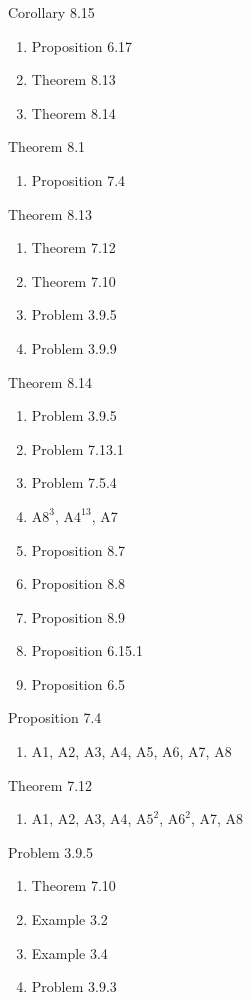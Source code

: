 \documentclass[11pt]{hmcpset}
\newenvironment{problem1}[1]{\noindent {\bf Problem #1}}
{\medskip}
\begin{document}
\begin{problem1}{3. (a)}
\noindent Corollary 8.15
\begin{enumerate}
\item{Proposition 6.17}
\item{Theorem 8.13}
\item{Theorem 8.14}\\
\end{enumerate}

\noindent Theorem 8.1
\begin{enumerate}
\item{Proposition 7.4}\\
\end{enumerate}

\noindent Theorem 8.13
\begin{enumerate}
\item{Theorem 7.12}
\item{Theorem 7.10}
\item{Problem 3.9.5}
\item{Problem 3.9.9}\\
\end{enumerate}

\noindent Theorem 8.14
\begin{enumerate}
\item{Problem 3.9.5}
\item{Problem 7.13.1}
\item{Problem 7.5.4}
\item{A$8^3$, A$4^{13}$, A7}
\item{Proposition 8.7}
\item{Proposition 8.8}
\item{Proposition 8.9}
\item{Proposition 6.15.1}
\item{Proposition 6.5}\\
\end{enumerate}

\noindent Proposition 7.4
\begin{enumerate}
\item{A1, A2, A3, A4, A5, A6, A7, A8}\\
\end{enumerate}

\noindent Theorem 7.12
\begin{enumerate}
\item{A1, A2, A3, A4, A$5^2$, A$6^2$, A7, A8}\\
\end{enumerate}

\noindent Problem 3.9.5
\begin{enumerate}
\item{Theorem 7.10}
\item{Example 3.2}
\item{Example 3.4}
\item{Problem 3.9.3}\\
\end{enumerate}


\end{problem1}
\end{document}
